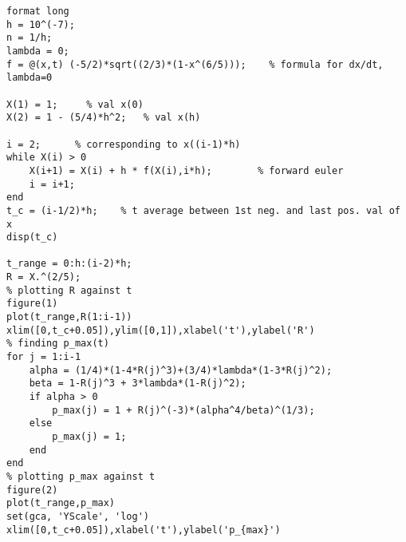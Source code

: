 \lstset{basicstyle=\footnotesize,style=myCustomMatlabStyle}
\begin{lstlisting}
format long
h = 10^(-7);
n = 1/h;
lambda = 0;
f = @(x,t) (-5/2)*sqrt((2/3)*(1-x^(6/5)));    % formula for dx/dt, lambda=0

X(1) = 1;     % val x(0)
X(2) = 1 - (5/4)*h^2;   % val x(h)

i = 2;      % corresponding to x((i-1)*h)
while X(i) > 0
    X(i+1) = X(i) + h * f(X(i),i*h);        % forward euler
    i = i+1;
end
t_c = (i-1/2)*h;    % t average between 1st neg. and last pos. val of x
disp(t_c)

t_range = 0:h:(i-2)*h;
R = X.^(2/5);
% plotting R against t
figure(1)
plot(t_range,R(1:i-1))
xlim([0,t_c+0.05]),ylim([0,1]),xlabel('t'),ylabel('R')
% finding p_max(t)
for j = 1:i-1
    alpha = (1/4)*(1-4*R(j)^3)+(3/4)*lambda*(1-3*R(j)^2);
    beta = 1-R(j)^3 + 3*lambda*(1-R(j)^2);
    if alpha > 0
        p_max(j) = 1 + R(j)^(-3)*(alpha^4/beta)^(1/3);
    else
        p_max(j) = 1;
    end
end
% plotting p_max against t
figure(2)
plot(t_range,p_max)
set(gca, 'YScale', 'log')
xlim([0,t_c+0.05]),xlabel('t'),ylabel('p_{max}')
\end{lstlisting}